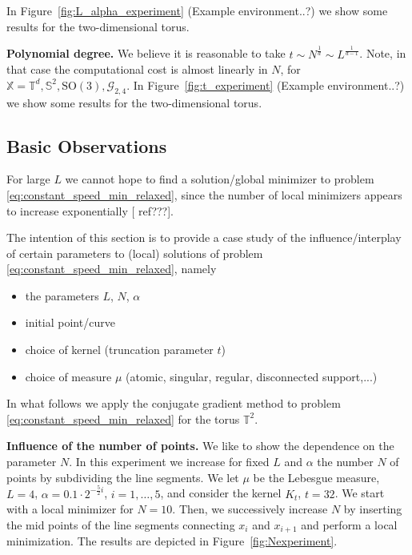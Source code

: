 \documentclass[%
a4paper,11pt,DIV=11,%
abstract=on%
]{scrartcl}
\begin{document}
In Figure~\ref{fig:L_alpha_experiment} {(\color{blue}Example environment..?)} we show some results for the two-dimensional torus. 

\textbf{Polynomial degree.} We believe it is reasonable to take $t \sim N^{\frac1d} \sim L^{\frac{1}{d-1}}$. Note, in that case the computational cost is almost linearly in $N$, for $\mathbb X = \mathbb T^{d}, \mathbb S^{2}, \mathrm{SO(3)}, \mathcal G_{2,4}$. In Figure~\ref{fig:t_experiment} {(\color{blue}Example environment..?)} we show some results for the two-dimensional torus. 



\subsection{Basic Observations}
For large $L$ we cannot hope to find a solution/global minimizer to problem \eqref{eq:constant_speed_min_relaxed}, since the number of local minimizers appears to increase exponentially {\color{blue}[ ref???]}.

The intention of this section is to provide a case study of the influence/interplay of certain parameters to (local) solutions of
problem \eqref{eq:constant_speed_min_relaxed}, namely
\begin{itemize}
\item the parameters $L$, $N$, $\alpha$
\item initial point/curve
\item choice of kernel (truncation parameter $t$)
\item choice of measure $\mu$ (atomic, singular, regular, disconnected support,...) 
\end{itemize}

In what follows we apply the conjugate gradient method to problem \eqref{eq:constant_speed_min_relaxed} for the torus $\mathbb T^{2}$.

\textbf{Influence of the number of points.} We like to show the dependence on the parameter $N$. In this experiment we increase for fixed $L$ and $\alpha$ the number $N$ of points by subdividing the line segments.  We let $\mu$ be the Lebesgue measure, $L=4$, $\alpha=0.1\cdot 2^{-\frac52 i}$, $i=1,\dots,5$, and consider the kernel $K_{t}$, $t=32$. We start with a local minimizer for $N=10$. Then, we successively increase $N$ by inserting the mid points of the line segments connecting $x_{i}$ and $x_{i+1}$ and perform a local minimization. The results are depicted in Figure~\ref{fig:Nexperiment}.
\end{document}
